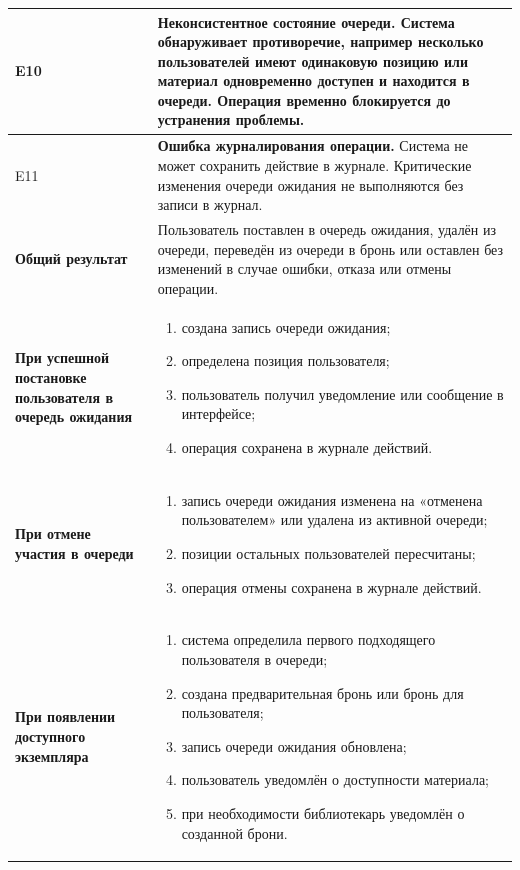 \documentclass[12pt,a4paper]{article}
\begin{document}
\begin{xltabular}{\textwidth}{
				|>{\raggedright\arraybackslash}p{2.7cm}
				|>{\raggedright\arraybackslash}X|
			}
			E10 &
			\textbf{Неконсистентное состояние очереди.}
			Система обнаруживает противоречие, например несколько пользователей
			имеют одинаковую позицию или материал одновременно доступен и
			находится в очереди. Операция временно блокируется до устранения
			проблемы. \\
			\hline
			
			E11 &
			\textbf{Ошибка журналирования операции.}
			Система не может сохранить действие в журнале. Критические изменения
			очереди ожидания не выполняются без записи в журнал. \\
			\hline
			
			
			\textbf{Общий результат} &
			Пользователь поставлен в очередь ожидания, удалён из очереди,
			переведён из очереди в бронь или оставлен без изменений в случае
			ошибки, отказа или отмены операции. \\
			\hline
			
			\textbf{При успешной постановке пользователя в очередь ожидания} &
			\begin{enumerate}
				\item создана запись очереди ожидания;
				\item определена позиция пользователя;
				\item пользователь получил уведомление или сообщение в интерфейсе;
				\item операция сохранена в журнале действий.
			\end{enumerate} \\
			\hline
			
			\textbf{При отмене участия в очереди} &
			\begin{enumerate}
				\item запись очереди ожидания изменена на «отменена пользователем»
				или удалена из активной очереди;
				\item позиции остальных пользователей пересчитаны;
				\item операция отмены сохранена в журнале действий.
			\end{enumerate} \\
			\hline
			
			\textbf{При появлении доступного экземпляра} &
			\begin{enumerate}
				\item система определила первого подходящего пользователя в очереди;
				\item создана предварительная бронь или бронь для пользователя;
				\item запись очереди ожидания обновлена;
				\item пользователь уведомлён о доступности материала;
				\item при необходимости библиотекарь уведомлён о созданной брони.
			\end{enumerate} \\
			\hline
			

\end{xltabular}
\end{document}
